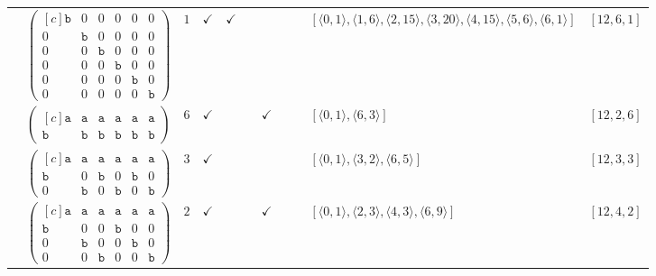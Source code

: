\documentclass[12pt]{article}
\theoremstyle{definition}
\theoremstyle{plain}
\begin{document}
{\begin{longtable}{@{}cYcccccccZc@{}}
\cmidrule(lr){2-11}

& $\begin{pmatrix*}[c]
\mathtt{b}  &  0  &  0  &  0  &  0  &  0  \\
0  &  \mathtt{b}  &  0  &  0  &  0  & 0  \\
0  &  0  &  \mathtt{b}  &  0  &  0  & 0   \\
0  &  0  &  0  &  \mathtt{b}  &  0   &  0  \\
0  &  0  &  0  &  0  &  \mathtt{b}   &  0  \\
0  &  0  &  0  &  0  &  0   &  \mathtt{b}
\end{pmatrix*}$
& $1$
& $\checkmark$
& $\checkmark$
&
&
&
&
& $[\langle0,1\rangle,\allowbreak\langle1,6\rangle,\allowbreak\langle2,15\rangle,\allowbreak\langle3,20\rangle,\allowbreak\langle4,15\rangle,\allowbreak\langle5,6\rangle,\allowbreak\langle6,1\rangle]$
& $[12,6,1]$  \\

\cmidrule(lr){2-11}

& $\begin{pmatrix*}[c]
\mathtt{a}  &  \mathtt{a}  &  \mathtt{a}  &  \mathtt{a}  &  \mathtt{a}  &  \mathtt{a}  \\
\mathtt{b}  &  \mathtt{b}  &  \mathtt{b}  &  \mathtt{b}  &  \mathtt{b}  &  \mathtt{b}
\end{pmatrix*}$
& $6$
& $\checkmark$
&
&
& $\checkmark$
&
&
& $[\langle0,1\rangle,\allowbreak\langle6,3\rangle]$
& $[12,2,6]$     \\

\cmidrule(lr){2-11}

& $\begin{pmatrix*}[c]
\mathtt{a}  &  \mathtt{a}  &  \mathtt{a}  &  \mathtt{a}  &  \mathtt{a}  &  \mathtt{a}  \\
\mathtt{b}  &  0  &  \mathtt{b}  &  0  &  \mathtt{b}  &  0  \\
0  &  \mathtt{b}  &  0  &  \mathtt{b}  &  0  &  \mathtt{b}
\end{pmatrix*}$
& $3$
& $\checkmark$
&
&
&
&
&
& $[\langle0,1\rangle,\allowbreak\langle3,2\rangle,\allowbreak\langle6,5\rangle]$
& $[12,3,3]$ \\

\cmidrule(lr){2-11}


& $\begin{pmatrix*}[c]
\mathtt{a}  &  \mathtt{a}  &  \mathtt{a}  &  \mathtt{a}  &  \mathtt{a}  &  \mathtt{a}  \\
\mathtt{b}  &  0  &  0  &  \mathtt{b}  &  0  &  0  \\
0  &  \mathtt{b}  &  0  &  0  &  \mathtt{b}  &  0  \\
0  &  0  &  \mathtt{b}  &  0  &  0  &  \mathtt{b}
\end{pmatrix*}$
& $2$
& $\checkmark$
&
&
& $\checkmark$
&
&
& $[\langle0,1\rangle,\allowbreak\langle2,3\rangle,\allowbreak\langle4,3\rangle,\allowbreak\langle6,9\rangle]$
& $[12,4,2]$  \\


\end{longtable}}
\end{document}
